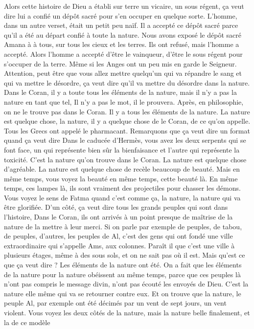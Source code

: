  Alors cette histoire de Dieu a établi sur terre un vicaire, un sous régent, ça veut dire lui a confié un dépôt sacré pour s'en occuper en quelque sorte.
L'homme, dans un autre verset, était un petit peu naïf. Il a accepté ce dépôt sacré parce qu'il a été au départ confié à toute la nature. Nous avons exposé le dépôt sacré Amana à à tous, sur tous les cieux et les terres. Ils ont refusé, mais l'homme a accepté.
Alors l'homme a accepté d'être le vainqueur, d'être le sous régent pour s'occuper de la terre. Même si les Anges ont un peu mis en garde le Seigneur. Attention, peut être que vous allez mettre quelqu'un qui va répandre le sang et  qui va mettre le désordre, ça veut dire qu'il va mettre du désordre dans la nature.
Dans le Coran, il  y a toute tous les éléments de la nature, mais il n'y a pas la nature en tant que tel, Il n'y a pas le mot, il le prouvera. Après, en philosophie, on ne le trouve pas dans le Coran. Il y a tous les éléments de la nature. La nature est quelque chose, la nature, il y a quelque chose de le Coran, de ce qu'on appelle.
Tous les Grecs ont appelé le pharmacant. Remarquons que ça veut dire un format quand ça veut dire Dans le caducée d'Hermès, vous avez les deux serpents qui se font face, un qui représente bien sûr la bienfaisance et l'autre qui représente la toxicité. C'est la nature qu'on trouve dans le Coran. La nature est quelque chose d'agréable.
La nature est quelque chose de recèle beaucoup de beauté.   Mais en même temps, vous voyez la beauté en même temps, cette beauté là. En même temps, ces lampes là, ils sont vraiment des projectiles pour chasser les démons. Vous voyez le sens de Fatma quand c'est comme ça, la nature, la nature qui va être glorifiée.
D'un côté, ça veut dire tous les grands peuples qui sont dans l'histoire, Dans le Coran, ils ont arrivés à un point presque de maîtrise de la nature de la mettre à leur merci. Si on parle par exemple de peuples, de tabou, de peuples, d'autres, les peuples de Al, c'est des gens qui ont fondé une ville extraordinaire qui s'appelle Ams, aux colonnes.
Paraît il que c'est une ville à plusieurs étages, même à des sous sols, et on ne sait pas où il est. Mais qu'est ce que ça veut dire ? Les éléments de la nature ont été. On a fait que les éléments de la nature pour la nature obéissent au même temps, parce que ces peuples là n'ont pas compris le message divin, n'ont pas écouté les envoyés de Dieu.
C'est la nature elle même qui va se retourner contre eux. Et on trouve que la nature, le peuple Al, par exemple ont été décimés par un vent de sept jours, un vent violent. Vous voyez les deux côtés de la nature, mais la nature belle finalement, et la de ce modèle 

